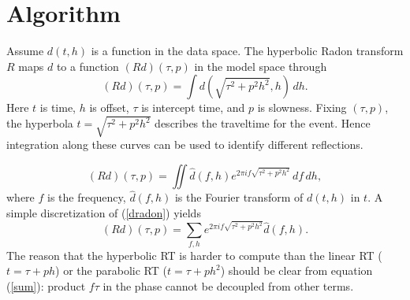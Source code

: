 

\section{Algorithm}

Assume $d(t,h)$ is a function in the data space. The hyperbolic Radon transform $R$ maps $d$ to a function $(Rd)(\tau,p)$ in the model space \citep{TC85} through
\begin{equation} \label{radon}
(Rd)(\tau,p)=\int d(\sqrt{\tau^2+p^2h^2},h)\,dh.
\end{equation}
Here $t$ is time, $h$ is offset, $\tau$ is intercept time, and $p$ is slowness. Fixing $(\tau,p)$, the hyperbola $t=\sqrt{\tau^2+p^2h^2}$ describes the traveltime for the event. Hence integration along these curves can be used to identify different reflections. 

\begin{equation} \label{dradon}
(Rd)(\tau,p)=\iint\hat{d}(f,h) e^{ 2\pi i
f\sqrt{\tau^2+p^2h^2} } \,df\,dh,
\end{equation}
where $f$ is the frequency, $\hat{d}(f,h)$ is the Fourier transform of $d(t,h)$ in $t$. A simple discretization of (\ref{dradon}) yields
\begin{equation} \label{sum}
(Rd)(\tau,p)=\sum_{f,h}  e^{ 2\pi i
 f\sqrt{\tau^2+p^2h^2} }\hat{d}(f,h).
\end{equation}
The reason that the hyperbolic RT is harder to compute than the linear RT ($t=\tau+ph$) or the parabolic RT ($t=\tau+ph^2$) should be clear from equation (\ref{sum}): product $f\tau$ in the phase cannot be decoupled from other terms.

